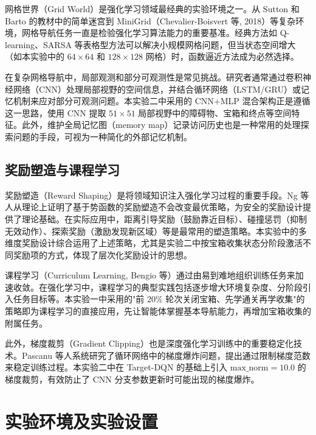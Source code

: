 \documentclass[12pt,a4paper]{article}
\begin{document}
网格世界（Grid World）是强化学习领域最经典的实验环境之一。从 Sutton 和 Barto\cite{sutton2018} 的教材中的简单迷宫到 MiniGrid（Chevalier-Boisvert 等, 2018）等复杂环境，网格导航任务一直是检验强化学习算法能力的重要基准。经典方法如 Q-learning、SARSA 等表格型方法可以解决小规模网格问题，但当状态空间增大（如本实验中的 $64\times64$ 和 $128\times128$ 网格）时，函数逼近方法成为必然选择。

在复杂网格导航中，局部观测和部分可观测性是常见挑战。研究者通常通过卷积神经网络（CNN）处理局部视野的空间信息，并结合循环网络（LSTM/GRU）或记忆机制来应对部分可观测问题。本实验二中采用的 CNN+MLP 混合架构正是遵循这一思路，使用 CNN 提取 $51\times51$ 局部视野中的障碍物、宝箱和终点等空间特征。此外，维护全局记忆图（memory map）记录访问历史也是一种常用的处理探索问题的手段，可视为一种简化的外部记忆机制。

\subsection{奖励塑造与课程学习}

奖励塑造（Reward Shaping）是将领域知识注入强化学习过程的重要手段。Ng 等人\cite{ng1999}从理论上证明了基于势函数的奖励塑造不会改变最优策略，为安全的奖励设计提供了理论基础。在实际应用中，距离引导奖励（鼓励靠近目标）、碰撞惩罚（抑制无效动作）、探索奖励（激励发现新区域）等是最常用的塑造策略。本实验中的多维度奖励设计综合运用了上述策略，尤其是实验二中按宝箱收集状态分阶段激活不同奖励项的方式，体现了层次化奖励设计的思想。

课程学习（Curriculum Learning, Bengio 等\cite{bengio2009}）通过由易到难地组织训练任务来加速收敛。在强化学习中，课程学习的典型实践包括逐步增大环境复杂度、分阶段引入任务目标等。本实验一中采用的"前 20\% 轮次关闭宝箱、先学通关再学收集"的策略即为课程学习的直接应用，先让智能体掌握基本导航能力，再增加宝箱收集的附属任务。

此外，梯度裁剪（Gradient Clipping）也是深度强化学习训练中的重要稳定化技术。Pascanu 等人\cite{pascanu2013}系统研究了循环网络中的梯度爆炸问题，提出通过限制梯度范数来稳定训练过程。本实验二中在 Target-DQN 的基础上引入 $\text{max\_norm}=10.0$ 的梯度裁剪，有效防止了 CNN 分支参数更新时可能出现的梯度爆炸。

\section{实验环境及实验设置}
\end{document}

